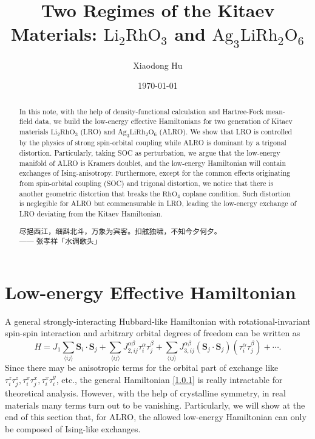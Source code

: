 \documentclass[10pt,nofootinbib,letterpaper]{revtex4}
\newcommand*{\kaishu}{\CJKfamily{kaishu}}
\begin{document}
\title{Two Regimes of the Kitaev Materials: $\mathrm{Li}_2\mathrm{RhO}_3$ and $\mathrm{Ag}_3\mathrm{Li}\mathrm{Rh}_2\mathrm{O}_6$}
\author{Xiaodong Hu}


\date{\today}

\begin{abstract}
	In this note, with the help of density-functional calculation and Hartree-Fock mean-field data, we build the low-energy effective Hamiltonians for two generation of Kitaev materials $\mathrm{Li}_2\mathrm{RhO}_3$ (LRO) and $\mathrm{Ag}_3\mathrm{Li}\mathrm{Rh}_2\mathrm{O}_6$ (ALRO). We show that LRO is controlled by the physics of strong spin-orbital coupling while ALRO is dominant by a trigonal distortion. Particularly, taking SOC as perturbation, we argue that the low-energy manifold of ALRO is Kramers doublet, and the low-energy Hamiltonian will contain exchanges of Ising-anisotropy. Furthermore, except for the common effects originating from spin-orbital coupling (SOC) and trigonal distortion, we notice that there is another geometric distortion that breaks the $\mathrm{RhO}_4$ coplane condition. Such distortion is neglegible for ALRO but commensurable in LRO, leading the low-energy exchange of LRO deviating from the Kitaev Hamiltonian.\par
		\hfill\par
		{\centering\kaishu 尽挹西江，细斟北斗，万象为宾客。扣舷独啸，不知今夕何夕。\\[0.5em]}
	\hfill------ 张孝祥「水调歌头」
\end{abstract}

\maketitle
\tableofcontents

\section{Low-energy Effective Hamiltonian}
	A general strongly-interacting Hubbard-like Hamiltonian with rotational-invariant spin-spin interaction and arbitrary orbital degrees of freedom can be written as
	\begin{equation}\label{1.0.1}
		H=J_1\sum_{\langle ij \rangle}\bm{S}_i\cdot\bm{S}_j+\sum_{\langle ij \rangle}J_{2,ij}^{\alpha\beta}\tau_i^\alpha \tau_j^\beta+\sum_{\langle ij \rangle}J_{3,ij}^{\alpha\beta}(\bm{S}_j\cdot\bm{S}_j)(\tau_i^\alpha \tau_j^\beta)+\cdots.
	\end{equation}
	\indent Since there may be anisotropic terms for the orbital part of exchange like $\tau_i^z\tau_j^z,\tau_i^x\tau_j^x,\tau_i^x\tau_i^y$, etc., the general Hamiltonian \eqref{1.0.1} is really intractable for theoretical analysis. However, with the help of crystalline symmetry, in real materials many terms turn out to be vanishing. Particularly, we will show at the end of this section that, for ALRO, the allowed low-energy Hamiltonian can only be composed of Ising-like exchanges.
\end{document}
